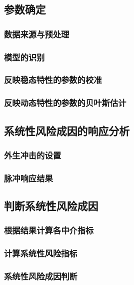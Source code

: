 \newpage
\subsection{参数确定}

\subsubsection{数据来源与预处理}
\subsubsection{模型的识别}
\subsubsection{反映稳态特性的参数的校准}
\subsubsection{反映动态特性的参数的贝叶斯估计}

\newpage
\subsection{系统性风险成因的响应分析}

\subsubsection{外生冲击的设置}
\subsubsection{脉冲响应结果}

\newpage
\subsection{判断系统性风险成因}

\subsubsection{根据结果计算各中介指标}
\subsubsection{计算系统性风险指标}
\subsubsection{系统性风险成因判断}

